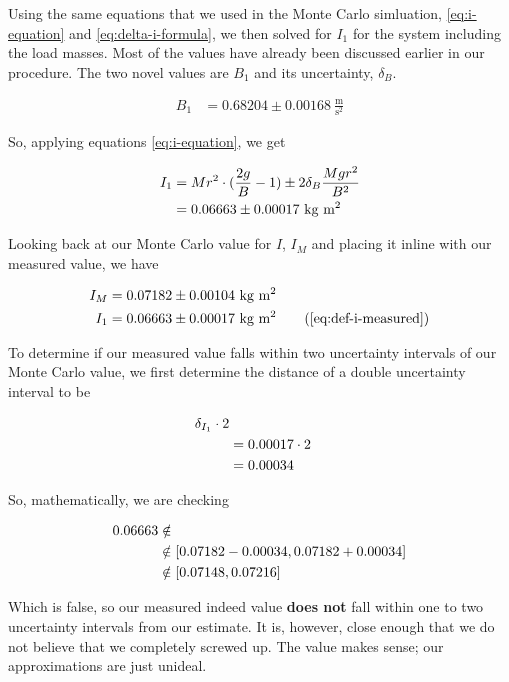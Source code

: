 \documentclass[coverpage]{article}
\newcommand{\iUnit}{\text{kg $\text{m}^2$}}
\newcommand{\mpssq}{\frac{\text{m}}{\text{s}^2}}
\begin{document}
	Using the same equations that we used in the Monte Carlo simluation, \ref{eq:i-equation} and \ref{eq:delta-i-formula}, we then solved for $I_1$ for the system including the load masses. Most of the values have already been discussed earlier in our procedure. The two novel values are $B_1$ and its uncertainty, $\delta_B$.
	
	\begin{align}
		B_1 &= 0.68204 \pm 0.00168\ \mpssq \label{eq:def-b1}
	\end{align}

	So, applying equations \ref{eq:i-equation}, we get
	
	\begin{align}
		I_1 &= Mr^2 \cdot (\frac{2g}{B} - 1) \pm 2 \delta_B \frac{M g r^2}{B^2} \notag \\
		&= 0.06663 \pm 0.00017\ \iUnit \label{eq:def-i-measured}
	\end{align}

	Looking back at our Monte Carlo value for $I$, $I_M$ and placing it inline with our measured value, we have
		
	\begin{align}
		I_M &= 0.07182 \pm 0.00104\ \iUnit \notag \\
		I_1 &= 0.06663 \pm 0.00017\ \iUnit \tag{\ref{eq:def-i-measured}}
	\end{align}

	To determine if our measured value falls within two uncertainty intervals of our Monte Carlo value, we first determine the distance of a double uncertainty interval to be
	 
	\begin{align}
		\delta_{I_1} \cdot 2 \notag \\
		&= 0.00017 \cdot 2 \notag \\
		&= 0.00034 \notag
	\end{align}
	
	So, mathematically, we are checking
	
	\begin{align}
		0.06663 &\notin \notag \\
		&\notin [0.07182 - 0.00034, 0.07182 + 0.00034] \notag \\
		&\notin [0.07148, 0.07216]
	\end{align}

	\newcommand{\iSkew}{\Delta{I}_{\text{skew}}}

	Which is false, so our measured indeed value \textbf{does not} fall within one to two uncertainty intervals from our estimate. It is, however, close enough that we do not believe that we completely screwed up. The value makes sense; our approximations are just unideal.
\end{document}
